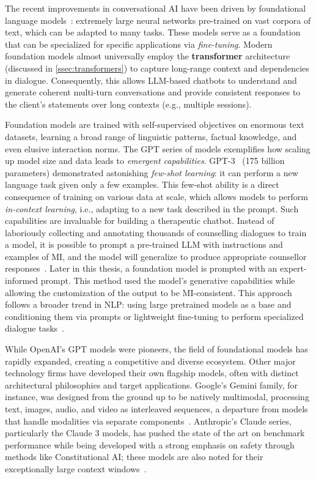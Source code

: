 The recent improvements in conversational AI have been driven by foundational language models~\cite{stanfordCRFM2021}: extremely large neural networks pre-trained on vast corpora of text, which can be adapted to many tasks. These models serve as a foundation that can be specialized for specific applications via \emph{fine-tuning}. Modern foundation models almost universally employ the \textbf{transformer} architecture (discussed in \cref{ssec:transformers}) to capture long-range context and dependencies in dialogue. Consequently, this allows LLM-based chatbots to understand and generate coherent multi-turn conversations and provide consistent responses to the client's statements over long contexts (e.g., multiple sessions).

Foundation models are trained with self-supervised objectives on enormous text datasets, learning a broad range of linguistic patterns, factual knowledge, and even elusive interaction norms. The GPT series of models exemplifies how scaling up model size and data leads to \emph{emergent capabilities}. GPT-3~\cite{brown2020language} (175 billion parameters) demonstrated astonishing \emph{few-shot learning}: it can perform a new language task given only a few examples. This few-shot ability is a direct consequence of training on various data at scale, which allows models to perform \emph{in-context learning}, i.e., adapting to a new task described in the prompt. Such capabilities are invaluable for building a therapeutic chatbot. Instead of laboriously collecting and annotating thousands of counselling dialogues to train a model, it is possible to prompt a pre-trained LLM with instructions and examples of MI, and the model will generalize to produce appropriate counsellor responses~\cite{xie-etal-2024-shot-dialogue}. Later in this thesis, a foundation model is prompted with an expert-informed prompt. This method used the model's generative capabilities while allowing the customization of the output to be MI-consistent. This approach follows a broader trend in NLP: using large pretrained models as a base and conditioning them via prompts or lightweight fine-tuning to perform specialized dialogue tasks~\cite{10.5555/3600270.3602070}.

While OpenAI's GPT models were pioneers, the field of foundational models has rapidly expanded, creating a competitive and diverse ecosystem. Other major technology firms have developed their own flagship models, often with distinct architectural philosophies and target applications. Google's Gemini family, for instance, was designed from the ground up to be natively multimodal, processing text, images, audio, and video as interleaved sequences, a departure from models that handle modalities via separate components~\cite{team2023gemini}. Anthropic's Claude series, particularly the Claude 3 models, has pushed the state of the art on benchmark performance while being developed with a strong emphasis on safety through methods like Constitutional AI; these models are also noted for their exceptionally large context windows~\cite{anthropic2024claude}.

